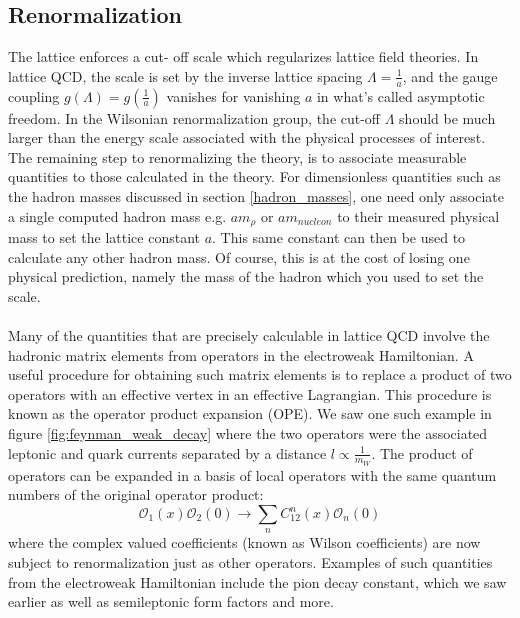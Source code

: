 \documentclass[a4paper,10pt]{article}
\begin{document}
\subsection{Renormalization}\label{Renormalization}
The lattice enforces a cut- off scale which regularizes lattice field theories. In lattice QCD, the scale is set by the inverse lattice spacing $\Lambda = \frac{1}{a}$, and the gauge coupling $g(\Lambda) = g\left( \frac{1}{a} \right)$ vanishes for vanishing $a$ in what's called asymptotic freedom. In the Wilsonian renormalization group, the cut-off $\Lambda$ should be much larger than the energy scale associated with the physical processes of interest. The remaining step to renormalizing the theory, is to associate measurable quantities to those calculated in the theory. For dimensionless quantities such as the hadron masses discussed in section \ref{hadron_masses}, one need only associate a single computed hadron mass e.g. $am_\rho$ or $am_{nucleon}$ to their measured physical mass to set the lattice constant $a$. This same constant can then be used to calculate any other hadron mass. Of course, this is at the cost of losing one physical prediction, namely the mass of the hadron which you used to set the scale.\\\\Many of the quantities that are precisely calculable in lattice QCD involve the hadronic matrix elements from operators in the electroweak Hamiltonian. A useful procedure for obtaining such matrix elements is to replace a product of two operators with an effective vertex in an effective Lagrangian. This procedure is known as the operator product expansion (OPE). We saw one such example in figure \ref{fig:feynman_weak_decay} where the two operators were the associated leptonic and quark currents separated by a distance $l \propto \frac{1}{m_W}$. The product of operators can be expanded in a basis of local operators with the same quantum numbers of the original operator product:
\begin{equation}
\mathcal{O}_{1}(x) \mathcal{O}_{2}(0) \rightarrow \sum_{n} C_{12}^{n}(x) \mathcal{O}_{n}(0)
\end{equation}
where the complex valued coefficients (known as Wilson coefficients) are now subject to renormalization just as other operators. Examples of such quantities from the electroweak Hamiltonian include the pion decay constant, which we saw earlier as well as semileptonic form factors and more.
\end{document}
